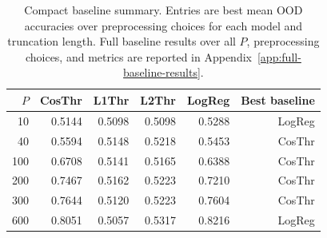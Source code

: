 \begin{table}[t]
\centering
\small
\begin{tabular}{rrrrrr}
\hline\hline
\(P\) & CosThr & L1Thr & L2Thr & LogReg & Best baseline \\
\hline
10 & 0.5144 & 0.5098 & 0.5098 & 0.5288 & LogReg \\
40 & 0.5594 & 0.5148 & 0.5218 & 0.5453 & CosThr \\
100 & 0.6708 & 0.5141 & 0.5165 & 0.6388 & CosThr \\
200 & 0.7467 & 0.5162 & 0.5223 & 0.7210 & CosThr \\
300 & 0.7644 & 0.5120 & 0.5223 & 0.7604 & CosThr \\
600 & 0.8051 & 0.5057 & 0.5317 & 0.8216 & LogReg \\
\hline\hline
\end{tabular}
\caption{Compact baseline summary. Entries are best mean OOD accuracies over preprocessing choices for each model and truncation length. Full baseline results over all \(P\), preprocessing choices, and metrics are reported in Appendix~\ref{app:full-baseline-results}.}
\label{tab:baseline-main}
\end{table}
